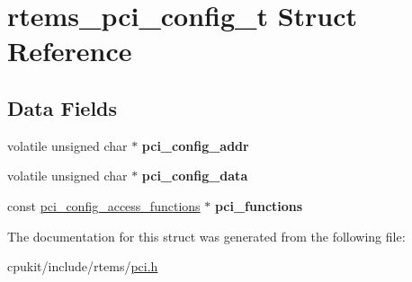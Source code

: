 \hypertarget{structrtems__pci__config__t}{}\section{rtems\+\_\+pci\+\_\+config\+\_\+t Struct Reference}
\label{structrtems__pci__config__t}
\subsection*{Data Fields}
\begin{DoxyCompactItemize}
\item 
\mbox{\label{structrtems__pci__config__t_af4c4d40ab01236aa606fc7ccd2030b9f}} 
volatile unsigned char $\ast$ {\bfseries pci\+\_\+config\+\_\+addr}
\item 
\mbox{\label{structrtems__pci__config__t_a513f3367bc23a9da9d21ef6b285e3f7f}} 
volatile unsigned char $\ast$ {\bfseries pci\+\_\+config\+\_\+data}
\item 
\mbox{\label{structrtems__pci__config__t_abac10e86e0a7996048d1cb33d4e361af}} 
const \mbox{\hyperlink{structpci__config__access__functions}{pci\+\_\+config\+\_\+access\+\_\+functions}} $\ast$ {\bfseries pci\+\_\+functions}
\end{DoxyCompactItemize}


The documentation for this struct was generated from the following file\+:\begin{DoxyCompactItemize}
\item 
cpukit/include/rtems/\mbox{\hyperlink{cpukit_2include_2rtems_2pci_8h}{pci.\+h}}\end{DoxyCompactItemize}
